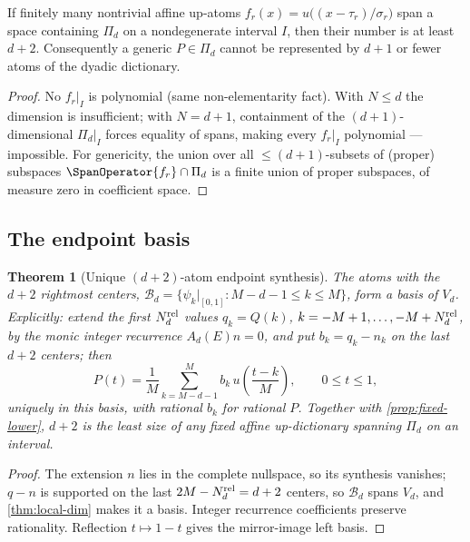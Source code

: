 \documentclass[11pt,oneside]{article}
\numberwithin{equation}{section}
\newtheorem{theorem}{Theorem}[section]
\theoremstyle{definition}
\theoremstyle{remark}
\newcommand{\PiD}{\Pi_d}
\begin{document}
\begin{proposition}
\label{prop:fixed-lower}
If finitely many nontrivial affine up-atoms
$f_r(x)=u\bigl((x-\tau_r)/\sigma_r\bigr)$ span a space containing
$\PiD$ on a nondegenerate interval $I$, then their number is at least
$d+2$.  Consequently a generic $P\in\PiD$ cannot be represented by
$d+1$ or fewer atoms of the dyadic dictionary.
\end{proposition}

\begin{proof}
No $f_r|_I$ is polynomial (same non-elementarity fact).  With $N\le d$
the dimension is insufficient; with $N=d+1$, containment of the
$(d+1)$-dimensional $\PiD|_I$ forces equality of spans, making every
$f_r|_I$ polynomial --- impossible.  For genericity, the union over
all $\le(d+1)$-subsets of (proper) subspaces
$\SpanOperator\{f_r\}\cap\PiD$ is a finite union of proper subspaces, of
measure zero in coefficient space.
\end{proof}

\subsection{The endpoint basis}

\begin{theorem}[Unique $(d+2)$-atom endpoint synthesis]
\label{thm:endpoint-basis}
The atoms with the $d+2$ rightmost centers,
$\mathcal B_d=\{\psi_k|_{[0,1]}:M-d-1\le k\le M\}$, form a basis of
$V_d$.  Explicitly: extend the first
$N_d^{\rm rel}$ values $q_k=Q(k)$,
$k=-M+1,\dots,-M+N_d^{\rm rel}$, by the monic integer
recurrence $A_d(E)n=0$, and put $b_k=q_k-n_k$ on the last $d+2$
centers; then
\begin{equation}
 \boxed{\;
 P(t)=\frac1M\sum_{k=M-d-1}^{M}b_k\,
 u\!\left(\frac{t-k}{M}\right),
 \qquad 0\le t\le1,
 \;}
 \label{eq:endpoint-rep}
\end{equation}
uniquely in this basis, with rational $b_k$ for rational $P$.
Together with \cref{prop:fixed-lower}, $d+2$ is the least size of any
fixed affine up-dictionary spanning $\PiD$ on an interval.
\end{theorem}

\begin{proof}
The extension $n$ lies in the complete nullspace, so its synthesis
vanishes; $q-n$ is supported on the last
$2M-N_d^{\rm rel}=d+2$ centers, so
$\mathcal B_d$ spans $V_d$, and \cref{thm:local-dim} makes it a
basis.  Integer recurrence coefficients preserve rationality.
Reflection $t\mapsto1-t$ gives the mirror-image left basis.
\end{proof}
\end{document}
